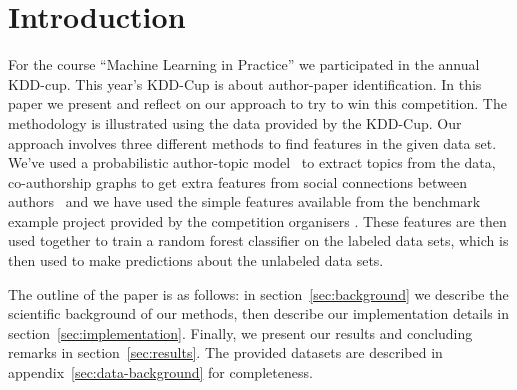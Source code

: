 \section{Introduction}

For the course ``Machine Learning in Practice'' we participated in the annual KDD-cup.
This year's KDD-Cup is about author-paper identification.
In this paper we present and reflect on our approach to try to win this competition.
The methodology is illustrated using the data provided by the KDD-Cup.
Our approach involves three different methods to find features in the given data set.
We've used a probabilistic author-topic model~\cite{steyvers2004probabilistic} to extract topics from  the data, co-authorship graphs to get extra features from social connections between authors~\cite{liu2005co} and we have used the simple features available from the benchmark example project provided by the competition organisers \cite{kddcupsite}.
These features are then used together to train a random forest classifier on the labeled data sets, which is then used to make predictions about the unlabeled data sets.

The outline of the paper is as follows: in section~\ref{sec:background} we describe the scientific background of our methods, then describe our implementation details in section~\ref{sec:implementation}. Finally, we present our results and concluding remarks in section~\ref{sec:results}.
The provided datasets are described in appendix~\ref{sec:data-background} for completeness.
